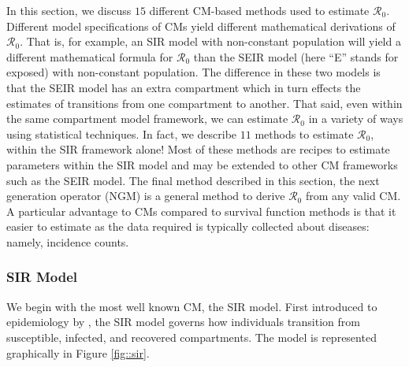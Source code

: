 \documentclass[12pt]{article}
\newcommand{\xxsir}{\ensuremath{11}} %
\newcommand{\rr}{\ensuremath{\mathcal{R}_0}}
\begin{document}
In this section, we discuss $15$ different CM-based methods used to estimate $\rr$.  Different model specifications of CMs yield different mathematical derivations of $\rr$.  That is, for example, an SIR model with non-constant population will yield a different mathematical formula for $\rr$ than the SEIR model (here ``E'' stands for exposed) with non-constant population.  The difference in these two models is that the SEIR model has an extra compartment which in turn effects the estimates of transitions from one compartment to another.  That said, even within the same compartment model framework, we can estimate $\rr$ in a variety of ways using statistical techniques.  In fact, we describe $\xxsir$ methods to estimate $\rr$, within the SIR framework alone!  Most of these methods are recipes to estimate parameters within the SIR model and may be extended to other CM frameworks such as the SEIR model.  The final method described in this section, the next generation operator (NGM) is a general method to derive $\rr$ from any valid CM.  A particular advantage to CMs compared to survival function methods is that it easier to estimate as the data required is typically collected about diseases: namely, incidence counts.  




\subsubsection{SIR Model}
\label{sec:sir-model}

We begin with the most well known CM, the SIR model.   First introduced to epidemiology by  \cite{Kermack700}, the SIR model governs how individuals transition from susceptible, infected, and recovered compartments.  The model is represented graphically in Figure \ref{fig::sir}. 
\end{document}
